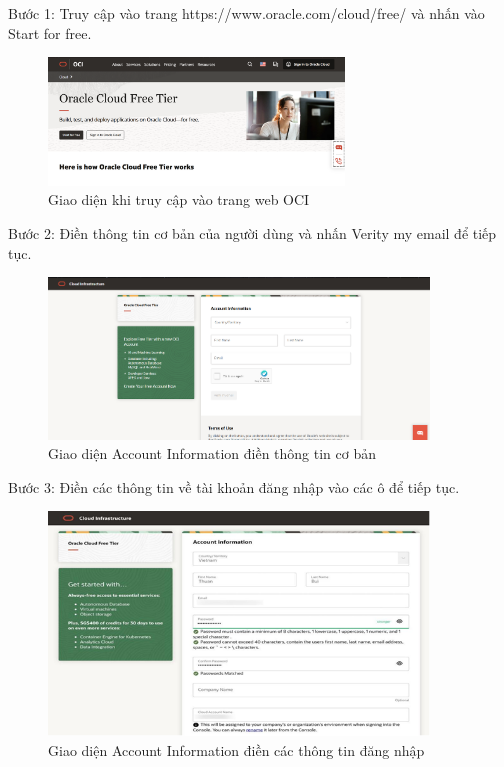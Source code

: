 \begin{myitem}
\item Bước 1: Truy cập vào trang https://www.oracle.com/cloud/free/ và nhấn vào Start for free.

\begin{figure}[H] %
    \centering
    \includegraphics[width=0.7\textwidth]{Demo/Giao_dien_truy_cap.png}
    \caption{Giao diện khi truy cập vào trang web OCI}
    \label{fig:cloud_intro}
\end{figure}

\item Bước 2: Điền thông tin cơ bản của người dùng và nhấn Verity my email để tiếp tục.

\begin{figure}[H] %
    \centering
    \includegraphics[width=0.9\textwidth]{Demo/Account_Information.png}
    \caption{Giao diện Account Information điền thông tin cơ bản}
    \label{fig:cloud_intro}
\end{figure}

\item Bước 3: Điền các thông tin về tài khoản đăng nhập vào các ô để tiếp tục.

\begin{figure}[H] %
    \centering
    \includegraphics[width=0.9\textwidth]{Demo/Account_Information_dang_nhap.png}
    \caption{Giao diện Account Information điền các thông tin đăng nhập}
    \label{fig:cloud_intro}
\end{figure}


\end{myitem}
